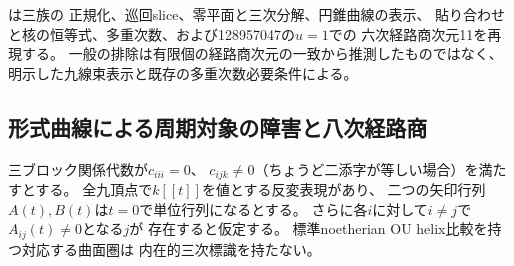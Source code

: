 \begin{remark}
は三族の
正規化、巡回slice、零平面と三次分解、円錐曲線の表示、
貼り合わせと核の恒等式、多重次数、および128957047の$u=1$での
六次経路商次元11を再現する。
一般の排除は有限個の経路商次元の一致から推測したものではなく、
明示した九線束表示と既存の多重次数必要条件による。
\end{remark}

\subsection{形式曲線による周期対象の障害と八次経路商}
\label{subsec:ou-seven-zero-formal-arc}

\begin{lemma}[周期単純対象の有界なheadを持つ厚化による障害]
\label{lem:ou-periodic-formal-arc-obstruction}
三ブロック関係代数が$c_{iii}=0$、
$c_{ijk}\ne0$（ちょうど二添字が等しい場合）を満たすとする。
全九頂点で$k[[t]]$を値とする反変表現があり、
二つの矢印行列$A(t),B(t)$は$t=0$で単位行列になるとする。
さらに各$i$に対して$i\ne j$で$A_{ij}(t)\ne0$となる$j$が
存在すると仮定する。
標準noetherian OU helix比較を持つ対応する曲面圏は
内在的三次標識を持たない。
\end{lemma}
